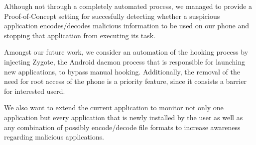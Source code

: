 Although not through a completely automated process, we 
managed to provide a Proof-of-Concept setting for succesfully 
detecting whether a suspicious application encodes/decodes 
malicious information to be used on our phone and stopping
that application from executing its task.

Amongst our future work, we consider an automation of the hooking 
process by injecting Zygote, the Android daemon process 
that is responsible for launching new applications, to bypass 
manual hooking. Additionally, the removal of the need for root access 
of the phone is a priority feature, since it consists a barrier for interested
userd.

We also want to extend the current application to monitor not 
only one application but every application that is newly installed
 by the user as well as any combination of possibly encode/decode
 file formats to increase awareness regarding malicious applications.
